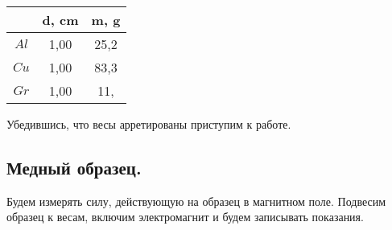 \documentclass{article}
\begin{document}
    \begin {table}[H]
        \centering
    \begin{tabular}{|c|c|c|}
        \hline
                & d, cm & m, g  \\\hline
        \(Al\)  & 1,00  & 25,2  \\\hline
        \(Cu\)  & 1,00  & 83,3  \\\hline
        \(Gr\)  & 1,00  & 11,   \\\hline
        
        
    \end{tabular}
    \end{table}


    Убедившись, что весы арретированы приступим к работе.

    \subsection{Медный образец.}
    Будем измерять силу, действующую на образец в магнитном поле. Подвесим образец к весам,
    включим электромагнит и будем записывать показания.
\end{document}
